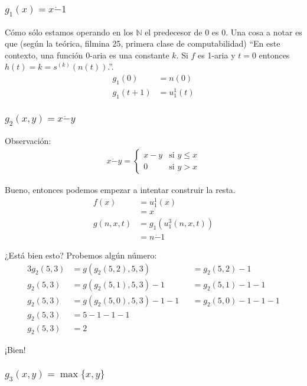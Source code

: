 \documentclass[fleqn, 11pt]{article}
\newcommand{\nat}{\mathbb{N}}
\begin{document}
\subsubsection{$g_1(x) = x \dot- 1$}

Cómo sólo estamos operando en los $\nat$ el predecesor de 0 es 0. Una cosa a
notar es que (según la teórica, filmina 25, primera clase de computabilidad)
``En este contexto, una función 0-aria es una constante $k$. Si $f$ es 1-aria y
$t = 0$ entonces $h(t) = k = s^{(k)}(n(t))$.''.
\begin{align*}
	g_1(0)     &= n(0)\\
	g_1(t + 1) &= u^1_1(t)
\end{align*}

\subsubsection{$g_2(x, y) = x \dot- y$}

Observación:
\begin{align*}
	x \dot- y =
	\begin{cases}
		x - y & \text{si } y \le x \\
		0     & \text{si } y > x
	\end{cases}
\end{align*}

Bueno, entonces podemos empezar a intentar construir la resta.
\begin{align*}
	f(x)       &= u^1_1(x) \\
	&= x \\
	g(n, x, t) &= g_1(u^3_1(n, x, t)) \\
	&= n \dot- 1
\end{align*}

¿Está bien esto? Probemos algún número:
\begin{alignat*}{3}
	g_2(5, 3) &= g(g_2(5, 2), 5, 3)         &&= g_2(5, 2) - 1 \\
	g_2(5, 3) &= g(g_2(5, 1), 5, 3) - 1     &&= g_2(5, 1) - 1 - 1 \\
	g_2(5, 3) &= g(g_2(5, 0), 5, 3) - 1 - 1 &&= g_2(5, 0) - 1 - 1 - 1 \\
	g_2(5, 3) &= 5 - 1 - 1 - 1 \\
	g_2(5, 3) &= 2
\end{alignat*}

¡Bien!

\subsubsection{$g_3(x, y) = \max\{x, y\}$}
\end{document}
